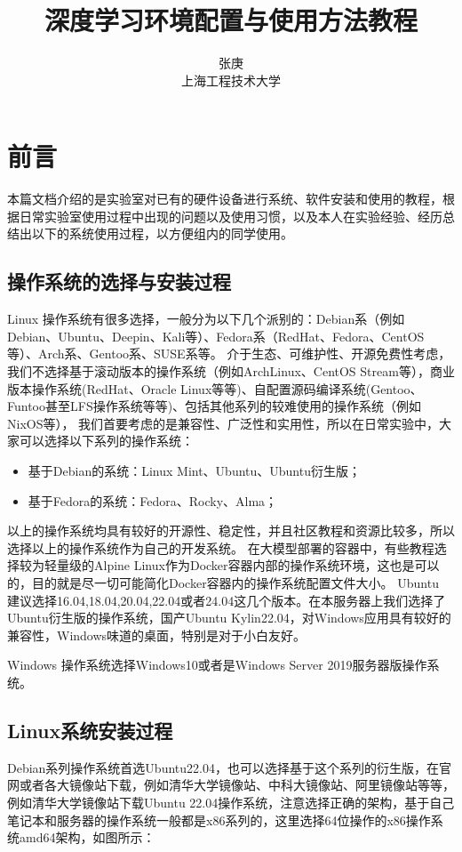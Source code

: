 \documentclass[lang=cn,a4paper,newtx]{elegantpaper}
\title{深度学习环境配置与使用方法教程}
\author{张庚 \\ 上海工程技术大学}
\institute{电子电气工程学院7719实验室}
\date{\zhdate{2023/12/24}}
\begin{document}
\maketitle

\tableofcontents
\newpage

\section{前言}
本篇文档介绍的是实验室对已有的硬件设备进行系统、软件安装和使用的教程，根据日常实验室使用过程中出现的问题以及使用习惯，以及本人在实验经验、经历总结出以下的系统使用过程，以方便组内的同学使用。

\subsection{操作系统的选择与安装过程}
Linux 操作系统有很多选择，一般分为以下几个派别的：Debian系（例如Debian、Ubuntu、Deepin、Kali等）、Fedora系（RedHat、Fedora、CentOS等）、Arch系、Gentoo系、SUSE系等。
介于生态、可维护性、开源免费性考虑，我们不选择基于滚动版本的操作系统（例如ArchLinux、CentOS Stream等），商业版本操作系统(RedHat、Oracle Linux等等)、自配置源码编译系统(Gentoo、Funtoo甚至LFS操作系统等等)、包括其他系列的较难使用的操作系统（例如NixOS等），
我们首要考虑的是兼容性、广泛性和实用性，所以在日常实验中，大家可以选择以下系列的操作系统：
\begin{itemize}
  \item 基于Debian的系统：Linux Mint、Ubuntu、Ubuntu衍生版；
  \item 基于Fedora的系统：Fedora、Rocky、Alma；
\end{itemize}


以上的操作系统均具有较好的开源性、稳定性，并且社区教程和资源比较多，所以选择以上的操作系统作为自己的开发系统。
在大模型部署的容器中，有些教程选择较为轻量级的Alpine Linux作为Docker容器内部的操作系统环境，这也是可以的，目的就是尽一切可能简化Docker容器内的操作系统配置文件大小。
Ubuntu 建议选择16.04,18.04,20.04,22.04或者24.04这几个版本。在本服务器上我们选择了Ubuntu衍生版的操作系统，国产Ubuntu Kylin22.04，对Windows应用具有较好的兼容性，Windows味道的桌面，特别是对于小白友好。

Windows 操作系统选择Windows10或者是Windows Server 2019服务器版操作系统。

\subsection{Linux系统安装过程}

Debian系列操作系统首选Ubuntu22.04，也可以选择基于这个系列的衍生版，在官网或者各大镜像站下载，例如清华大学镜像站、中科大镜像站、阿里镜像站等等，
例如清华大学镜像站下载Ubuntu 22.04操作系统，注意选择正确的架构，基于自己笔记本和服务器的操作系统一般都是x86系列的，这里选择64位操作的x86操作系统amd64架构，如图所示：
\end{document}
